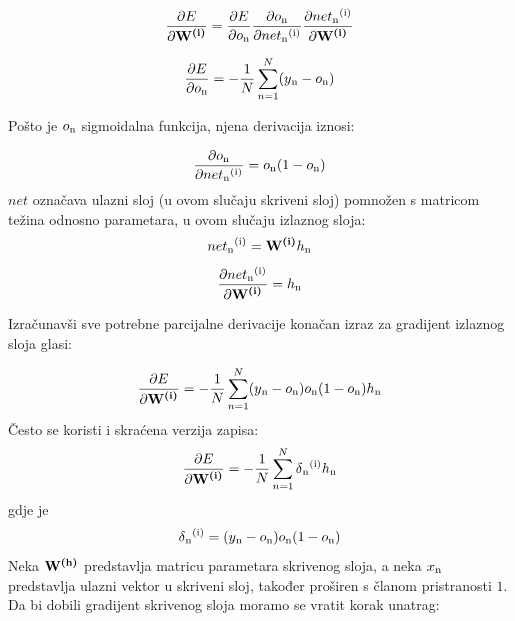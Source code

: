 \documentclass[times, utf8, diplomski]{fer}
\begin{document}
\begin{equation}
	\frac{\partial E}{\partial \textbf{W\textsuperscript{(i)}}} = \frac{\partial E}{\partial o\textsubscript{n}} \frac{\partial o\textsubscript{n}}{\partial net\textsubscript{n}\textsuperscript{(i)}} \frac{\partial net\textsubscript{n}\textsuperscript{(i)}}{\partial \textbf{W\textsuperscript{(i)}}}
\end{equation}

\begin{equation}
	\frac{\partial E}{\partial o\textsubscript{n}} = -\frac{1}{N}\sum_{n=1}^{N}(y\textsubscript{n} - o\textsubscript{n})
\end{equation}

Pošto je $o\textsubscript{n}$ sigmoidalna funkcija, njena derivacija iznosi:

\begin{equation}
	\frac{\partial o\textsubscript{n}}{\partial net\textsubscript{n}\textsuperscript{(i)}} = o\textsubscript{n} (1 - o\textsubscript{n})	
\end{equation}
$net$ označava ulazni sloj (u ovom slučaju skriveni sloj) pomnožen s matricom težina odnosno parametara, u ovom slučaju izlaznog sloja:
\begin{equation}
	net\textsubscript{n}\textsuperscript{(i)} = \textbf{W\textsuperscript{(i)}} h\textsubscript{n}
\end{equation}
\begin{equation}
	\frac{\partial net\textsubscript{n}\textsuperscript{(i)}}{\partial \textbf{W\textsuperscript{(i)}}} = h\textsubscript{n}
\end{equation}

Izračunavši sve potrebne parcijalne derivacije konačan izraz za gradijent izlaznog sloja glasi:

\begin{equation}
	\frac{\partial E}{\partial \textbf{W\textsuperscript{(i)}}} = -\frac{1}{N}\sum_{n=1}^{N}(y\textsubscript{n} - o\textsubscript{n})o\textsubscript{n} (1 - o\textsubscript{n})h\textsubscript{n}
\end{equation}
Često se koristi i skraćena verzija zapisa:
\begin{equation}
	\frac{\partial E}{\partial \textbf{W\textsuperscript{(i)}}} = -\frac{1}{N}\sum_{n=1}^{N} \delta\textsubscript{n}\textsuperscript{(i)}h\textsubscript{n}
\end{equation}
gdje je
\begin{equation}
	\delta\textsubscript{n}\textsuperscript{(i)} = (y\textsubscript{n} - o\textsubscript{n})o\textsubscript{n} (1 - o\textsubscript{n})
\end{equation}
Neka $\textbf{W\textsuperscript{(h)}}$ predstavlja matricu parametara skrivenog sloja, a neka $x\textsubscript{n}$ predstavlja ulazni vektor u skriveni sloj, također proširen s članom pristranosti $1$. Da bi dobili gradijent skrivenog sloja moramo se vratit korak unatrag:
\end{document}
